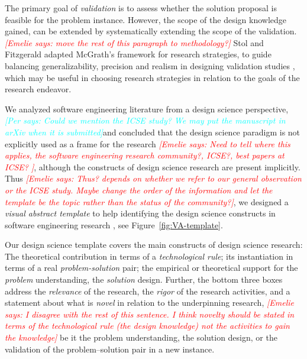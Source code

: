 \documentclass[graybox]{svmult}
\newcommand{\emelie}[1]{\textcolor{red}{{\it [Emelie says: #1]}}}
\newcommand{\per}[1]{\textcolor{cyan}{{\it [Per says: #1]}}}
\newcommand{\emelie}[1]{}
\newcommand{\per}[1]{}
\begin{document}
 The primary goal of \emph{validation} is to assess whether the solution proposal is feasible for the problem instance. However, the scope of the design knowledge gained, can be extended by systematically extending the scope of the validation.  \emelie{move the rest of this paragraph to methodology?} Stol and Fitzgerald adapted McGrath's framework for research strategies, to guide balancing generalizability, precision and realism in designing validation studies \cite{StolABC18}, which may be useful in choosing research strategies in relation to the goals of the research endeavor.


We analyzed software engineering literature from a design science perspective, \per{Could we mention the ICSE study? We may put the manuscript in arXiv when it is submitted}and concluded that the design science paradigm is not explicitly used as a frame for the research \emelie{Need to tell where this applies, the software engineering research community?, ICSE?, best papers at ICSE? }, although the constructs of design science research are present implicitly. Thus \emelie{Thus? depends on whether we refer to our general observation or the ICSE study. Maybe change the order of the information and let the template be the topic rather than the status of the community?}, we designed a \emph{visual abstract template} to help identifying the design science constructs in software engineering research \cite{StoreyESEM17}, see Figure~\ref{fig:VA-template}. 

Our design science template covers the main constructs of design science research: The theoretical contribution in terms of a \emph{technological rule}; its instantiation in terms of a real \emph{problem-solution} pair;  the empirical or theoretical support for the \emph{problem} understanding, the \emph{solution} design. Further, the bottom three boxes address the \emph{relevance} of the research, the \emph{rigor} of the research activities, and a statement about what is \emph{novel} in relation to the underpinning research, \emelie{I disagree with the rest of this sentence. I think novelty should be stated in terms of the technological rule (the design knowledge) not the activities to gain the knowledge} be it the problem understanding, the solution design, or the validation of the problem--solution pair in a new instance.
\end{document}
